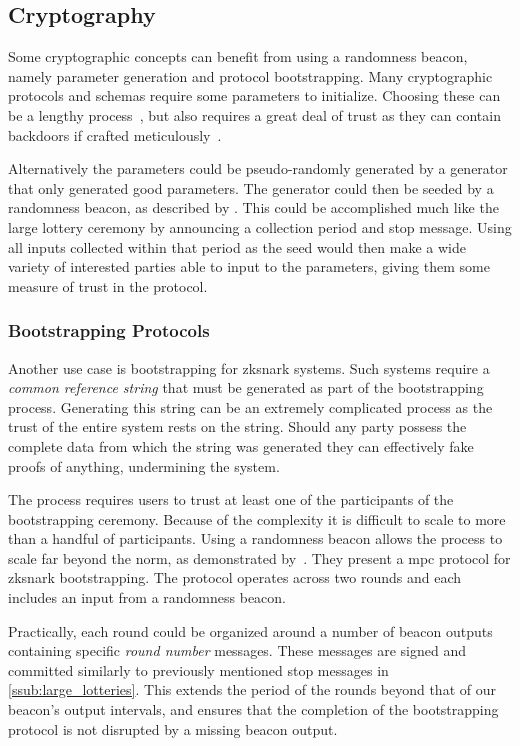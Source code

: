 \subsection{Cryptography}
Some cryptographic concepts can benefit from using a randomness beacon, namely parameter generation and protocol bootstrapping.
Many cryptographic protocols and schemas require some parameters to initialize.
Choosing these can be a lengthy process~\cite{mpcsnarks}, but also requires a great deal of trust as they can contain backdoors if crafted meticulously~\cite{nist2014backdoor}.

Alternatively the parameters could be pseudo-randomly generated by a generator that only generated good parameters.
The generator could then be seeded by a randomness beacon, as described by \citet{baigneres2015trap}.
This could be accomplished much like the large lottery ceremony by announcing a collection period and stop message.
Using all inputs collected within that period as the seed would then make a wide variety of interested parties able to input to the parameters, giving them some measure of trust in the protocol.

\subsubsection{Bootstrapping Protocols}%
\label{ssub:bootstrapping_protocols}
Another use case is bootstrapping for \gls{zksnark} systems.
Such systems require a \emph{common reference string} that must be generated as part of the bootstrapping process.
Generating this string can be an extremely complicated process as the trust of the entire system rests on the string.
Should any party possess the complete data from which the string was generated they can effectively fake proofs of anything, undermining the system.

The process requires users to trust at least one of the participants of the bootstrapping ceremony.
Because of the complexity it is difficult to scale to more than a handful of participants.
Using a randomness beacon allows the process to scale far beyond the norm, as demonstrated by~\citet{mpcsnarks}.
They present a \acrshort{mpc} protocol for \acrshort{zksnark} bootstrapping.
The protocol operates across two rounds and each includes an input from a randomness beacon. %

Practically, each round could be organized around a number of beacon outputs containing specific \textit{round number} messages.
These messages are signed and committed similarly to previously mentioned stop messages in \cref{ssub:large_lotteries}.
This extends the period of the rounds beyond that of our beacon's output intervals, and ensures that the completion of the bootstrapping protocol is not disrupted by a missing beacon output.

